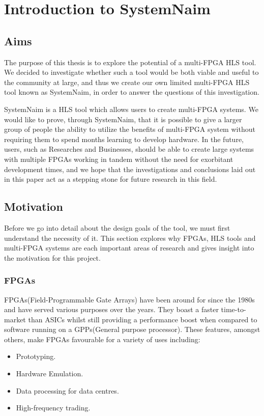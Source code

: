 \chapter{Introduction to SystemNaim}
\label{sec:intro}

\section{Aims}

The purpose of this thesis is to explore the potential of a multi-FPGA HLS tool. We decided to investigate whether such a tool would be both viable and useful to the community at large, and thus we create our own limited multi-FPGA HLS tool known as SystemNaim, in order to answer the questions of this investigation.

SystemNaim is a HLS tool which allows users to create multi-FPGA systems. We would like to prove, through SystemNaim, that it is possible to give a larger group of people the ability to utilize the benefits of multi-FPGA system without requiring them to spend months learning to develop hardware. In the future, users, such as Researches and Businesses, should be able to create large systems with multiple FPGAs working in tandem without the need for exorbitant development times, and we hope that the investigations and conclusions laid out in this paper act as a stepping stone for future research in this field.

\section{Motivation}

Before we go into detail about the design goals of the tool, we must first understand the necessity of it. This section explores why FPGAs, HLS tools and multi-FPGA systems are each important areas of research and gives insight into the motivation for this project.

\subsection{FPGAs}

FPGAs(Field-Programmable Gate Arrays) have been around for since the 1980s and have served various purposes over the years\cite{fpga-history}. They boast a faster time-to-market than ASICs whilst still providing a performance boost when compared to software running on a GPPs(General purpose processor). These features, amongst others, make FPGAs favourable for a variety of uses including:
\begin{itemize}
    \item Prototyping.
    \item Hardware Emulation.
    \item Data processing for data centres.
    \item High-frequency trading.
 \end{itemize}

